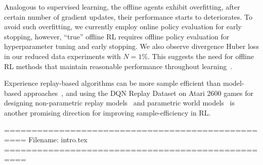 Analogous to supervised learning, the offline agents
exhibit overfitting, \ie after certain number of gradient updates, their performance starts to deteriorates. To avoid such overfitting, we currently employ online policy evaluation for early stopping, however, ``true'' offline RL requires offline policy evaluation for hyperparameter tuning and early stopping. We also observe divergence \wrt Huber loss in our reduced data experiments with $N=1\%$. This suggests the need for offline RL methods that maintain reasonable performance throughout learning~\citep{garcia2015comprehensive}.


Experience replay-based algorithms can be more sample efficient than model-based approaches~\citep{van2019use}, and using the DQN Replay Dataset on Atari 2600 games for designing non-parametric replay models~\citep{pan2018organizing} and parametric world models~\citep{kaiser2019model} is another promising direction for improving sample-efficiency in RL. 




==================================================
Filename: intro.tex
==================================================


